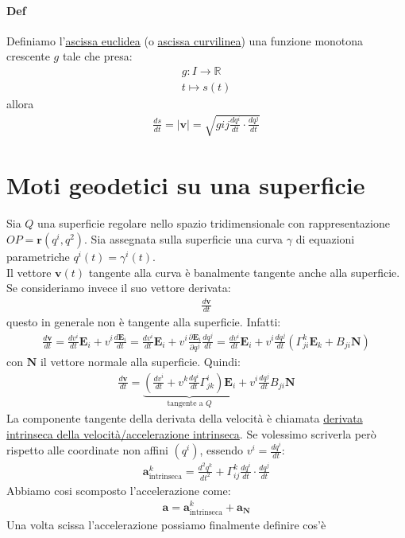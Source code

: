 \paragraph*{Def} Definiamo l'\underline{ascissa euclidea} (o \underline{ascissa curvilinea}) una funzione monotona crescente $g$ tale che presa:
\begin{align*}
    g\colon I \to \mathbb{R}\\
    t\mapsto s(t)
\end{align*}
allora 
\begin{align*}
    \frac{ds}{dt}=|\mathbf{v}|=\sqrt{gij\frac{dq^i}{dt}\cdot \frac{dq^j}{dt}}
\end{align*}
\section{Moti geodetici su una superficie}
Sia $Q$ una superficie regolare nello spazio tridimensionale con rappresentazione $OP=\mathbf{r}(q^i,q^2)$. Sia assegnata sulla superficie una curva $\gamma$ di equazioni parametriche $q^i(t)=\gamma^i(t)$.\\
Il vettore $\mathbf{v}(t)$ tangente alla curva è banalmente tangente anche alla superficie. Se consideriamo invece il suo vettore derivata:
\begin{align*}
    \frac{d\mathbf{v}}{dt}
\end{align*}
questo in generale non è tangente alla superficie. Infatti:
\begin{align*}
   \frac{d\mathbf{v}}{dt} =\frac{dv^i}{dt}\mathbf{E}_i+v^i\frac{d\mathbf{E}_i}{dt}=\frac{dv^i}{dt}\mathbf{E}_i+v^i\frac{\partial \mathbf{E}_i}{\partial q^j}\frac{dq^j}{dt}=\frac{dv^i}{dt}\mathbf{E}_i+v^i\frac{dq^j}{dt}(\Gamma_{ji}^k\mathbf{E}_k+B_{ji}\mathbf{N})
\end{align*}
con $\mathbf{N}$ il vettore normale alla superficie. Quindi:
\begin{align*}
    \frac{d\mathbf{v}}{dt}=\underbrace{\left(\frac{dv^i}{dt}+v^k\frac{dq^i}{dt}\Gamma^i_{jk}\right)\mathbf{E}_i}_{\text{tangente a }Q}+v^i\frac{dq^j}{dt}B_{ji}\mathbf{N}
\end{align*}
La componente tangente della derivata della velocità è chiamata \underline{derivata intrinseca della velocità/accelerazione intrinseca}. Se volessimo scriverla però rispetto alle coordinate non affini $(q^i)$, essendo $v^i=\frac{dq^i}{dt}$:
\begin{align*}
    \mathbf{a}^k_{\text{intrinseca}}=\frac{d^2q^k}{dt^2}+\Gamma^k_{ij}\frac{dq^i}{dt}\cdot \frac{dq^j}{dt}
\end{align*}
Abbiamo cosi scomposto l'accelerazione come:
\begin{align*}
    \mathbf{a}=\mathbf{a}^k_{\text{intrinseca}}+\mathbf{a}_{\mathbf{N}}
\end{align*}
Una volta scissa l'accelerazione possiamo finalmente definire cos'è 
